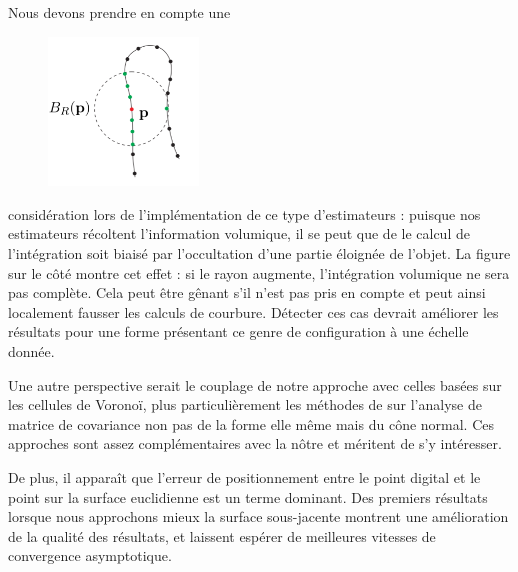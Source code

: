 Nous devons prendre en compte une
%
\begin{figure}
	\includegraphics[width=4cm]{images/CriticalRadius}
\end{figure}
%
considération lors de l'implémentation de ce type d'estimateurs : puisque nos
estimateurs récoltent l'information volumique, il se peut que de le calcul de
l'intégration soit biaisé par l'occultation d'une partie éloignée de l'objet. La
figure sur le côté montre cet effet : si le rayon augmente, l'intégration
volumique ne sera pas complète. Cela peut être gênant s'il n'est pas pris en
compte et peut ainsi localement fausser les calculs de courbure. Détecter ces
cas devrait améliorer les résultats pour une forme présentant ce genre de
configuration à une échelle donnée.

Une autre perspective serait le couplage de notre approche avec celles basées
sur les cellules de Voronoï, plus particulièrement les méthodes de \VCMM
\cite{Merigot2009,Merigot2011,Cuel2014DGCI} sur l'analyse de matrice de covariance
non pas de la forme elle même mais du cône normal. Ces approches sont
assez complémentaires avec la nôtre et méritent de s'y intéresser.

De plus, il apparaît que l'erreur de positionnement entre le point digital et le
point sur la surface euclidienne est un terme dominant. Des premiers résultats
lorsque nous approchons mieux la surface sous-jacente montrent une amélioration de
la qualité des résultats, et laissent espérer de meilleures vitesses de
convergence asymptotique.

%
